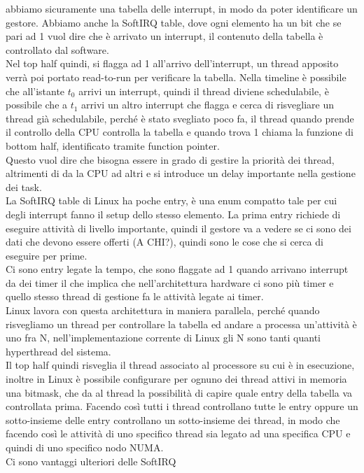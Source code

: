 \documentclass[12pt, oneside]{extbook}
\begin{document}
abbiamo sicuramente una tabella delle interrupt, in modo da poter identificare un gestore. Abbiamo anche la SoftIRQ table, dove ogni elemento ha un bit che se pari ad 1 vuol dire che è arrivato un interrupt, il contenuto della tabella è controllato dal software.\\Nel top half quindi, si flagga ad 1 all'arrivo dell'interrupt, un thread apposito verrà poi portato read-to-run per verificare la tabella. Nella timeline è possibile che all'istante $t_0$ arrivi un interrupt, quindi il thread diviene schedulabile, è possibile che a $t_1$ arrivi un altro interrupt che flagga e cerca di risvegliare un thread già schedulabile, perché è stato svegliato poco fa, il thread quando prende il controllo della CPU controlla la tabella e quando trova 1 chiama la funzione di bottom half, identificato tramite function pointer.\\Questo vuol dire che bisogna essere in grado di gestire la priorità dei thread, altrimenti di da la CPU ad altri e si introduce un delay importante nella gestione dei task.\\La SoftIRQ table di Linux ha poche entry, è una enum compatto tale per cui degli interrupt fanno il setup dello stesso elemento. La prima entry richiede di eseguire attività di livello importante, quindi il gestore va a vedere se ci sono dei dati che devono essere offerti (A CHI?), quindi sono le cose che si cerca di eseguire per prime.\\Ci sono entry legate la tempo, che sono flaggate ad 1 quando arrivano interrupt da dei timer il che implica che nell'architettura hardware ci sono più timer e quello stesso thread di gestione fa le attività legate ai timer.\\Linux lavora con questa architettura in maniera parallela, perché quando risvegliamo un thread per controllare la tabella ed andare a processa un'attività è uno fra N, nell'implementazione corrente di Linux gli N sono tanti quanti hyperthread del sistema.\\Il top half quindi risveglia il thread associato al processore su cui è in esecuzione, inoltre in Linux è possibile configurare per ognuno dei thread attivi in memoria una bitmask, che da al thread la possibilità di capire quale entry della tabella va controllata prima. Facendo così tutti i thread controllano tutte le entry oppure un sotto-insieme delle entry controllano un sotto-insieme dei thread, in modo che facendo così le attività di uno specifico thread sia legato ad una specifica CPU e quindi di uno specifico nodo NUMA.\\Ci sono vantaggi ulteriori delle SoftIRQ
\end{document}
